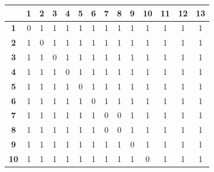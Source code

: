 \documentclass[fleqn]{article}
\begin{document}
\begin{table}[H]
\centering
\begin{tabular}{c|ccccccccccccc}
\textbf{}   & \textbf{1} & \textbf{2} & \textbf{3} & \textbf{4} & \textbf{5} & \textbf{6} & \textbf{7} & \textbf{8} & \textbf{9} & \textbf{10} & \textbf{11} & \textbf{12} & \textbf{13} \\ \hline
\textbf{1}  & 0          & 1          & 1          & 1          & 1          & 1          & 1          & 1          & 1          & 1           & 1           & 1           & 1           \\
\textbf{2}  & 1          & 0          & 1          & 1          & 1          & 1          & 1          & 1          & 1          & 1           & 1           & 1           & 1           \\
\textbf{3}  & 1          & 1          & 0          & 1          & 1          & 1          & 1          & 1          & 1          & 1           & 1           & 1           & 1           \\
\textbf{4}  & 1          & 1          & 1          & 0          & 1          & 1          & 1          & 1          & 1          & 1           & 1           & 1           & 1           \\
\textbf{5}  & 1          & 1          & 1          & 1          & 0          & 1          & 1          & 1          & 1          & 1           & 1           & 1           & 1           \\
\textbf{6}  & 1          & 1          & 1          & 1          & 1          & 0          & 1          & 1          & 1          & 1           & 1           & 1           & 1           \\
\textbf{7}  & 1          & 1          & 1          & 1          & 1          & 1          & 0          & 0          & 1          & 1           & 1           & 1           & 1           \\
\textbf{8}  & 1          & 1          & 1          & 1          & 1          & 1          & 0          & 0          & 1          & 1           & 1           & 1           & 1           \\
\textbf{9}  & 1          & 1          & 1          & 1          & 1          & 1          & 1          & 1          & 0          & 1           & 1           & 1           & 1           \\
\textbf{10} & 1          & 1          & 1          & 1          & 1          & 1          & 1          & 1          & 1          & 0           & 1           & 1           & 1           \\

\end{tabular}
\end{table}
\end{document}
